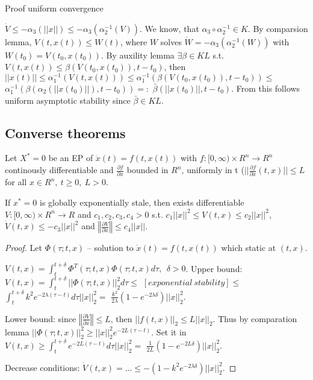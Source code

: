 Proof uniform convergence

$\dot V \le -\alpha_3(||x||)\le -\alpha_3(\alpha_2^{-1}(V))$. We know, that 
$\alpha_3 \circ \alpha_2^{-1} \in K$. By comparsion lemma, $V(t,x(t))\le W(t)$, where $W$
solves $\dot W=-\alpha_3(\alpha_2^{-1}(W))$ with $W(t_0)=V(t_0,x(t_0))$. By auxility lemma
$\exists \beta\in KL$ s.t. $V(t,x(t))\le\beta(V(t_0,x(t_0)), t-t_0)$, then
$||x(t)||\le\alpha^{-1}_1(V(t,x(t)))\le\alpha^{-1}_1(\beta(V(t_0,x(t_0)), t-t_0))\le$
$\alpha_1^{-1}(\beta(\alpha_2(||x(t_0)||),t-t_0))=:$
$\bar{\beta}(||x(t_0)||,t-t_0)$. From this follows uniform asymptotic stability since
$\bar{\beta}\in KL$.


\subsection{Converse theorems}

\begin{Theorem}
 Let $X^*=0$ be an EP of $\dot x(t)=f(t,x(t))$ with $f:[0,\infty)\times R^n \to R^n$
 continously differentiable and $\frac{\partial f}{\partial x}$ bounded in $R^n$,
 uniformly in t ($||\frac{\partial f}{\partial x}(t,x)||\le L$ for all 
 $x\in R^n,\ t\ge 0,\ L>0$.

 If $x^*=0$ is globally exponentially stale, then exists differentiable 
 $V:[0,\infty)\times R^n\to R$ and $c_1,c_2,c_3,c_4>0$ s.t.
 $c_1||x||^2\le V(t,x)\le c_2||x||^2$, $\dot V(t,x)\le -c_3||x||^2$ and
 $\left\Vert \frac{\partial V}{\partial x}\right\Vert \le c_4||x||$.

\begin{proof}
Let $\Phi(\tau;t,x)$ -- solution to $\dot x(t)=f(t, x(t))$ which static
at $(t,x)$.

$V(t,x)=\int_t^{t+\delta}\Phi^T(\tau;t,x)\Phi(\tau;t,x) d\tau, \ \ \delta>0$.
Upper bound: $V(t,x)=\int_t^{t+\delta}||\Phi(\tau;t,x)||_2^2 d\tau\le$
$[exponential\ stability]\le$
$\int_t^{t+\delta}k^2 e^{-2\lambda(\tau-t)}d\tau ||x||_2^2 =$
$\frac{k^2}{2\lambda}(1-e^{-2\lambda\delta})||x||_2^2$.

Lower bound: since $\left\Vert \frac{\partial V}{\partial x}\right\Vert \le L$, then
$||f(t,x)||_2\le L||x||_2$. Thus by comparation lemma 
$||\Phi(\tau;t,x)||_2^2\ge ||x||_2^2 e^{-2L(\tau-t)}$. Set it in 
$V(t,x)\ge \int_t^{t+\delta} e^{-2L(\tau-t)} d\tau ||x||_2^2=$
$\frac{1}{2L}(1-e^{-2L\delta})||x||_2^2$.

Decrease conditions: $\dot V(t,x)=\dots\le-(1-k^2 e^{-2\lambda\delta})||x||_2^2$.
\end{proof}
\end{Theorem}